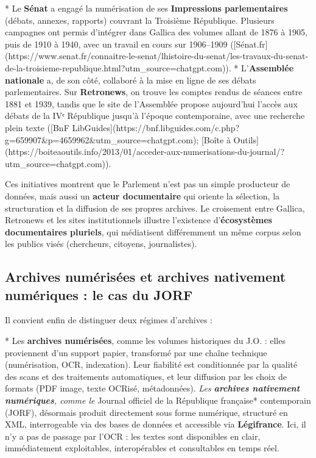 {* Le \textbf{Sénat} a engagé la numérisation de ses \textbf{Impressions parlementaires} (débats, annexes, rapports) couvrant la Troisième République. Plusieurs campagnes ont permis d’intégrer dans Gallica des volumes allant de 1876 à 1905, puis de 1910 à 1940, avec un travail en cours sur 1906–1909 ([Sénat.fr](https://www.senat.fr/connaitre-le-senat/lhistoire-du-senat/les-travaux-du-senat-de-la-troisieme-republique.html?utm_source=chatgpt.com)).
* L’\textbf{Assemblée nationale} a, de son côté, collaboré à la mise en ligne de ses débats parlementaires. Sur \textbf{Retronews}, on trouve les comptes rendus de séances entre 1881 et 1939, tandis que le site de l’Assemblée propose aujourd’hui l’accès aux débats de la IVᵉ République jusqu’à l’époque contemporaine, avec une recherche plein texte ([BnF LibGuides](https://bnf.libguides.com/c.php?g=659907&p=4659962&utm_source=chatgpt.com); [Boîte à Outils](https://boiteaoutils.info/2013/01/acceder-aux-numerisations-du-journal/?utm_source=chatgpt.com)).

Ces initiatives montrent que le Parlement n’est pas un simple producteur de données, mais aussi un \textbf{acteur documentaire} qui oriente la sélection, la structuration et la diffusion de ses propres archives. Le croisement entre Gallica, Retronews et les sites institutionnels illustre l’existence d’\textbf{écosystèmes documentaires pluriels}, qui médiatisent différemment un même corpus selon les publics visés (chercheurs, citoyens, journalistes).

\subsection{Archives numérisées et archives nativement numériques : le cas du JORF}

Il convient enfin de distinguer deux régimes d’archives :

* Les \textbf{archives numérisées}, comme les volumes historiques du J.O. : elles proviennent d’un support papier, transformé par une chaîne technique (numérisation, OCR, indexation). Leur fiabilité est conditionnée par la qualité des scans et des traitements automatiques, et leur diffusion par les choix de formats (PDF image, texte OCRisé, métadonnées).
\emph{ Les \textbf{archives nativement numériques}, comme le }Journal officiel de la République française* contemporain (JORF), désormais produit directement sous forme numérique, structuré en XML, interrogeable via des bases de données et accessible via \textbf{Légifrance}. Ici, il n’y a pas de passage par l’OCR : les textes sont disponibles en clair, immédiatement exploitables, interopérables et consultables en temps réel.

}

